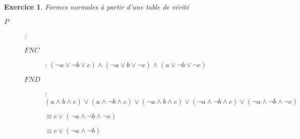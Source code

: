 \documentclass{article}
\theoremstyle{plain}
\newtheorem{exo}{Exercice}%
\begin{document}
\begin{exo} Formes normales à partir d'une table de vérité
    \begin{description}
        \item[$P$]:\begin{description}
            \item[$FNC$]: $(\neg a \vee \neg b \vee c) \wedge
                (\neg a \vee b \vee \neg c) \wedge
                (a \vee \neg b \vee \neg c)$
            \item[$FND$]: $(a \wedge b \wedge c) \vee 
                (a \wedge \neg b \wedge c) \vee 
                (\neg a \wedge b \wedge c) \vee 
                (\neg a \wedge \neg b \wedge c) \vee 
                (\neg a \wedge \neg b \wedge \neg c)$

                $\equiv c \vee (\neg a \wedge \neg b \wedge \neg c)$

                $\equiv c \vee (\neg a \wedge \neg b)$
        \end{description} 
    \end{description}
\end{exo}
\end{document}
